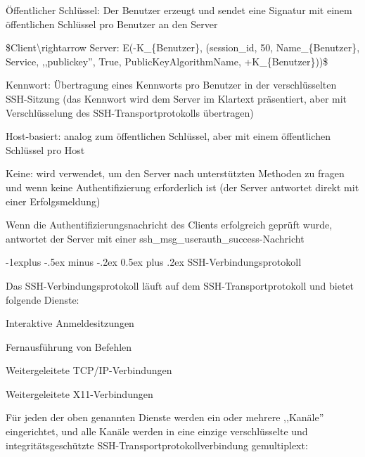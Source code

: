 \documentclass[a4paper]{article}
\makeatletter
\renewcommand{\subsection}{\@startsection{subsection}{2}{0mm}%
 {-1explus -.5ex minus -.2ex}%
 {0.5ex plus .2ex}%
 {\normalfont\normalsize\bfseries}}
\makeatother
\begin{document}
\begin{multicols}{3}
\begin{itemize*}
\begin{itemize*}
                  \begin{itemize*}
                        \item Öffentlicher Schlüssel: Der Benutzer erzeugt und sendet eine Signatur mit einem öffentlichen Schlüssel pro Benutzer an den Server
                        \item \$Client\textbackslash rightarrow Server: E(-K\_\{Benutzer\}, (session\_id, 50, Name\_\{Benutzer\}, Service, ,,publickey'', True, PublicKeyAlgorithmName, +K\_\{Benutzer\}))\$
                        \item Kennwort: Übertragung eines Kennworts pro Benutzer in der verschlüsselten SSH-Sitzung (das Kennwort wird dem Server im Klartext präsentiert, aber mit Verschlüsselung des SSH-Transportprotokolls übertragen)
                        \item Host-basiert: analog zum öffentlichen Schlüssel, aber mit einem öffentlichen Schlüssel pro Host
                        \item Keine: wird verwendet, um den Server nach unterstützten Methoden zu fragen und wenn keine Authentifizierung erforderlich ist (der Server antwortet direkt mit einer Erfolgsmeldung)
                  \end{itemize*}
                  \item
                  Wenn die Authentifizierungsnachricht des Clients erfolgreich geprüft
                  wurde, antwortet der Server mit einer
                  ssh\_msg\_userauth\_success-Nachricht
            \end{itemize*}


            \subsection{SSH-Verbindungsprotokoll}

            \begin{itemize*}
                  \item
                  Das SSH-Verbindungsprotokoll läuft auf dem SSH-Transportprotokoll und
                  bietet folgende Dienste:

                  \begin{itemize*}
                        \item Interaktive Anmeldesitzungen
                        \item Fernausführung von Befehlen
                        \item Weitergeleitete TCP/IP-Verbindungen
                        \item Weitergeleitete X11-Verbindungen
                  \end{itemize*}
                  \item
                  Für jeden der oben genannten Dienste werden ein oder mehrere
                  ,,Kanäle'' eingerichtet, und alle Kanäle werden in eine einzige
                  verschlüsselte und integritätsgeschützte
                  SSH-Transportprotokollverbindung gemultiplext:


\end{itemize*}
\end{itemize*}
\end{multicols}
\end{document}
